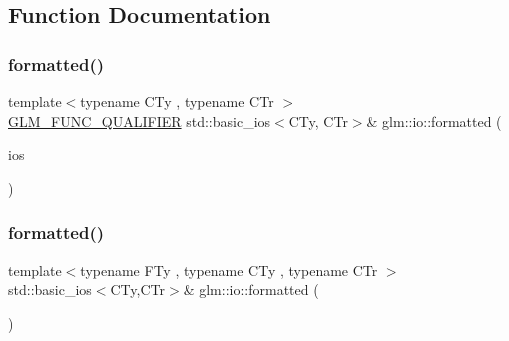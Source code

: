 \subsection{Function Documentation}
\mbox{\label{namespaceglm_1_1io_aa31ec433f6039e5bd35f0f58b37bef83}} 
\subsubsection{\texorpdfstring{formatted()}{formatted()}\hspace{0.1cm}{\footnotesize\ttfamily [1/2]}}
{\footnotesize\ttfamily template$<$typename C\+Ty , typename C\+Tr $>$ \\
\hyperlink{setup_8hpp_a33fdea6f91c5f834105f7415e2a64407}{G\+L\+M\+\_\+\+F\+U\+N\+C\+\_\+\+Q\+U\+A\+L\+I\+F\+I\+ER} std\+::basic\+\_\+ios$<$C\+Ty, C\+Tr$>$\& glm\+::io\+::formatted (\begin{DoxyParamCaption}\item[{std\+::basic\+\_\+ios$<$ C\+Ty, C\+Tr $>$ \&}]{ios }\end{DoxyParamCaption})}

\mbox{\label{namespaceglm_1_1io_a892800782557e1591ffcf8460578f8a8}} 
\subsubsection{\texorpdfstring{formatted()}{formatted()}\hspace{0.1cm}{\footnotesize\ttfamily [2/2]}}
{\footnotesize\ttfamily template$<$typename F\+Ty , typename C\+Ty , typename C\+Tr $>$ \\
std\+::basic\+\_\+ios$<$C\+Ty,C\+Tr$>$\& glm\+::io\+::formatted (\begin{DoxyParamCaption}\item[{std\+::basic\+\_\+ios$<$ C\+Ty, C\+Tr $>$ \&}]{ }\end{DoxyParamCaption})}

\mbox{\label{namespaceglm_1_1io_a9e8927cf032254b0eee4ec650286e1f9}} 
